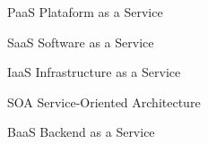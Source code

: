 



\begin{siglas}
  \item[PaaS] Plataform as a Service
  \item[SaaS] Software as a Service
  \item[IaaS] Infrastructure as a Service
  \item[SOA] Service-Oriented Architecture
  \item[BaaS] Backend as a Service
\end{siglas} 